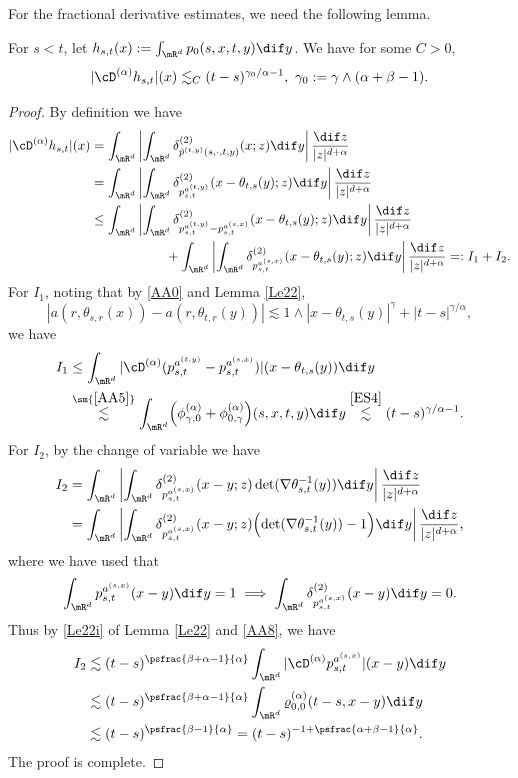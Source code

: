 For the fractional derivative estimates, we need the following lemma.
\begin{lemma}\label{Le34}
For $s<t$, let $h_{s,t}(x):=\int_{\mR^d}p_0(s,x,t,y)\dif y$. We have for some $C>0$,
\[
|\cD^{(\alpha)}h_{s,t}|(x)\lesssim_C(t-s)^{\gamma_0/\alpha-1},\ \gamma_0:=\gamma \wedge (\alpha+\beta-1).
\]
\end{lemma}
\begin{proof}
By definition we have
\begin{align*}
|\cD^{(\alpha)}h_{s,t}|(x)
&=\int_{\mR^d}\left|\int_{\mR^d}\delta^{(2)}_{\tilde p^{(t,y)}(s,\cdot,t,y)}(x;z)\dif y\right|\frac{\dif z}{|z|^{d+\alpha}}
\\&=\int_{\mR^d}\left|\int_{\mR^d}\delta^{(2)}_{p_{{s,t}}^{a^{(t,y)}}}(x-\theta_{t,s}(y);z)\dif y\right|\frac{\dif z}{|z|^{d+\alpha}}
\\&\leq\int_{\mR^d}\left|\int_{\mR^d}\delta^{(2)}_{p_{{s,t}}^{a^{(t,y)}}-p_{{s,t}}^{a^{(s,x)}}} (x-\theta_{t,s}(y);z)\dif y\right|\frac{\dif z}{|z|^{d+\alpha}}
\\&\hspace*{2cm}+\int_{\mR^d}\left|\int_{\mR^d}\delta^{(2)}_{p_{{s,t}}^{a^{(s,x)}}}(x-\theta_{t,s}(y);z)\dif y\right|\frac{\dif z}{|z|^{d+\alpha}}=:I_1+I_2.
\end{align*}
For $I_1$, noting that by \eqref{AA0} and Lemma \ref{Le22},
\[
|a(r,\theta_{s,r}(x))-a(r,\theta_{t,r}(y))|\lesssim 1\wedge |x-\theta_{t,s}(y)|^{\gamma}+|t-s|^{\gamma/\alpha},
\]
we have
\begin{align*}
I_1&\leq\int_{\mR^d}|\cD^{(\alpha)}(p_{s,t}^{a^{(t,y)}}-p_{s,t}^{a^{(s,x)}})|(x-\theta_{t,s}(y))\dif y
\\&\overset{\sm{\eqref{AA5}}}{\lesssim}\int_{\mR^d}\Bigl(\phi^{(\alpha)}_{\gamma,0}+\phi^{(\alpha)}_{0,\gamma}\Bigr)(s,x,t,y)\dif y
\overset{\eqref{ES4}}{\lesssim} (t-s)^{\gamma/\alpha-1}.
\end{align*}
For $I_2$, by the change of variable we have
\begin{align*}
I_2&=\int_{\mR^d}\left|\int_{\mR^d}\delta^{(2)}_{p_{s,t}^{a^{(s,x)}}}(x-y;z)\det(\nabla\theta^{-1}_{s,t}(y))\dif y\right|\frac{\dif z}{|z|^{d+\alpha}}
\\&=\int_{\mR^d}\left|\int_{\mR^d}\delta^{(2)}_{p_{s,t}^{a^{(s,x)}}}(x-y;z)\Bigl(\det(\nabla\theta^{-1}_{s,t}(y))-1\Bigr)\dif y\right|\frac{\dif z}{|z|^{d+\alpha}},
\end{align*}
where we have used that
\[
\int_{\mR^d}p_{s,t}^{a^{(s,x)}} (x-y)\dif y=1\implies \int_{\mR^d}\delta^{(2)}_{p_{s,t}^{a^{(s,x)}}}(x-y)\dif y=0.
\]
Thus by \eqref{Le22i} of Lemma \ref{Le22} and \eqref{AA8}, we have
\begin{align*}
I_2&\lesssim(t-s)^{\psfrac{\beta+\alpha-1}{\alpha}}\int_{\mR^d}|\cD^{(\alpha)}p_{s,t}^{a^{(s,x)}}|(x-y)\dif y
\\&\lesssim(t-s)^{\psfrac{\beta+\alpha-1}{\alpha}}\int_{\mR^d}\varrho^{(\alpha)}_{0,0}(t-s,x-y)\dif y\\
&\lesssim(t-s)^{\psfrac{\beta-1}{\alpha}}=(t-s)^{-1+\psfrac{\alpha+\beta-1}{\alpha}}.
\end{align*}
The proof is complete.
\end{proof}
